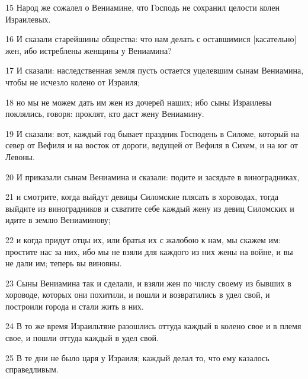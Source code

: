 \par 15 Народ же сожалел о Вениамине, что Господь не сохранил целости колен Израилевых.
\par 16 И сказали старейшины общества: что нам делать с оставшимися [касательно] жен, ибо истреблены женщины у Вениамина?
\par 17 И сказали: наследственная земля пусть остается уцелевшим сынам Вениамина, чтобы не исчезло колено от Израиля;
\par 18 но мы не можем дать им жен из дочерей наших; ибо сыны Израилевы поклялись, говоря: проклят, кто даст жену Вениамину.
\par 19 И сказали: вот, каждый год бывает праздник Господень в Силоме, который на север от Вефиля и на восток от дороги, ведущей от Вефиля в Сихем, и на юг от Левоны.
\par 20 И приказали сынам Вениамина и сказали: подите и засядьте в виноградниках,
\par 21 и смотрите, когда выйдут девицы Силомские плясать в хороводах, тогда выйдите из виноградников и схватите себе каждый жену из девиц Силомских и идите в землю Вениаминову;
\par 22 и когда придут отцы их, или братья их с жалобою к нам, мы скажем им: простите нас за них, ибо мы не взяли для каждого из них жены на войне, и вы не дали им; теперь вы виновны.
\par 23 Сыны Вениамина так и сделали, и взяли жен по числу своему из бывших в хороводе, которых они похитили, и пошли и возвратились в удел свой, и построили города и стали жить в них.
\par 24 В то же время Израильтяне разошлись оттуда каждый в колено свое и в племя свое, и пошли оттуда каждый в удел свой.
\par 25 В те дни не было царя у Израиля; каждый делал то, что ему казалось справедливым.


